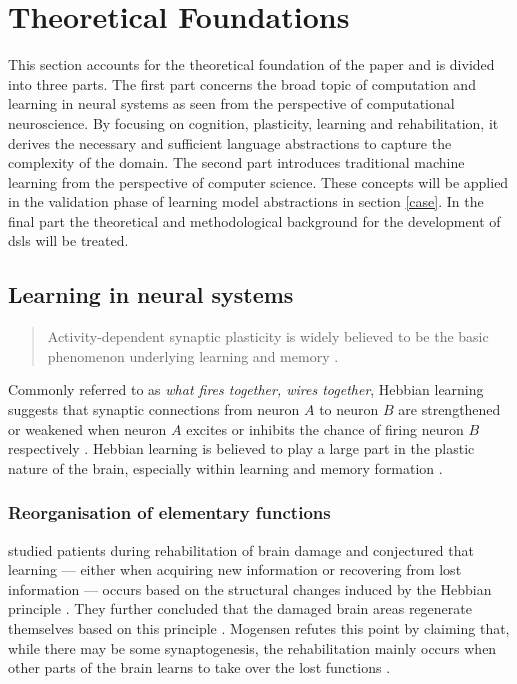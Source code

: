 \documentclass[a4paper,oneside]{memoir}
\begin{document}
{\let\clearpage\relax\chapter{Theoretical Foundations}}
This section accounts for the theoretical foundation of the paper and is divided
into three parts.
The first part concerns the broad topic of computation and learning in neural
systems as seen from the perspective of computational neuroscience. By focusing
on cognition, plasticity, learning and rehabilitation, it derives
the necessary and sufficient language abstractions to capture the complexity
of the domain.
The second part introduces traditional machine learning from the perspective of
computer science. These concepts will be applied in the validation phase of
learning model abstractions in section \ref{case}.
In the final part the theoretical and methodological background for the
development of \gls{dsl}s will be treated.

\section{Learning in neural systems}
\begin{quote}
  Activity-dependent synaptic plasticity is widely believed to be the basic
  phenomenon underlying learning and memory \autocite{dayan2001}.
\end{quote}

Commonly referred to as \textit{what fires together, wires together}, Hebbian
learning suggests that synaptic connections from neuron $A$ to neuron $B$
are strengthened or weakened when neuron $A$ excites or inhibits the chance of
firing neuron $B$ respectively \autocite{dayan2001}.
Hebbian learning is believed to play a large part in the plastic nature of the
brain, especially within learning and memory formation
\autocite{dayan2001, Johnston2009, Robertson1999}.

\subsection{Reorganisation of elementary functions}
\label{ref}

\autocite{Robertson1999} studied patients during
rehabilitation of brain damage and conjectured that learning --- either when
acquiring new information or recovering from lost information --- occurs based
on the structural changes induced by the Hebbian principle
\autocite{Robertson1999}. They further concluded that the damaged brain areas
regenerate themselves based on this principle \autocite{Robertson1999}.
Mogensen refutes this point by claiming that, while there
may be some synaptogenesis, the rehabilitation mainly occurs when other parts
of the brain learns to take over the lost functions \autocite{Mogensen2011}.
\end{document}
